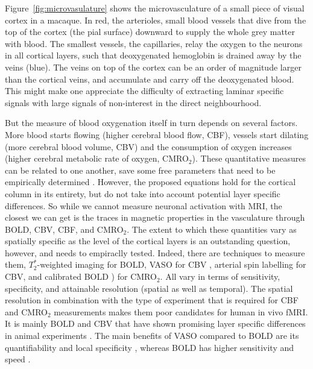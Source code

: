 Figure~\ref{fig:microvasulature} shows the microvasculature of a small piece of visual cortex in a macaque. In red, the arterioles, small blood vessels that dive from the top of the cortex (the pial surface) downward to supply the whole grey matter with blood. The smallest vessels, the capillaries, relay the oxygen to the neurons in all cortical layers, such that deoxygenated hemoglobin is drained away by the veins (blue). The veins on top of the cortex can be an order of magnitude larger than the cortical veins, and accumulate and carry off the deoxygenated blood. This might make one appreciate the difficulty of extracting laminar specific signals with large signals of non-interest in the direct neighbourhood.


But the measure of blood oxygenation itself in turn depends on several factors. More blood starts flowing (higher cerebral blood flow, CBF), vessels start dilating (more cerebral blood volume, CBV) and the consumption of oxygen increases (higher cerebral metabolic rate of oxygen, CMRO$_{2}$). These quantitative measures can be related to one another, save some free parameters that need to be empirically determined \cite{Davis1997}. However, the proposed equations hold for the cortical column in its entirety, but do not take into account potential layer specific differences. So while we cannot measure neuronal activation with MRI, the closest we can get is the traces in magnetic properties in the vasculature through BOLD, CBV, CBF, and CMRO$_{2}$. The extent to which these quantities vary as spatially specific as the level of the cortical layers is an outstanding question, however, and needs to empiraclly tested. Indeed, there are techniques to measure them, $T_2^*$-weighted imaging \cite{Norris2006} for BOLD, VASO for CBV \cite{Huber2018}, arterial spin labelling \cite{Grade2015} for CBV, and calibrated BOLD \cite{Blockley2013}) for CMRO$_{2}$. All vary in terms of sensitivity, specificity, and attainable resolution (spatial as well as temporal). The spatial resolution in combination with the type of experiment that is required for CBF and CMRO$_2$ measurements makes them poor candidates for human in vivo fMRI. It is mainly BOLD and CBV that have shown promising layer specific differences in animal experiments \cite{Lu2004,Zhao2006,Jin2008,Goense2012}. The main benefits of VASO compared to BOLD are its quantifiability \cite{Lu2003} and local specificity \cite{Jin2006}, whereas BOLD has higher sensitivity and speed \cite{Huber2018}.

